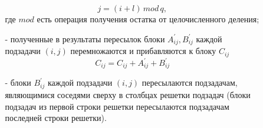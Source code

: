 \documentclass{report}
\begin{document}
\begin{enumerate}
\begin{itemize}
\begin{itemize}
$$                {\mathit j = (i + l) \, mod \, q,}
                $$
                где {\itshape $mod$} есть операция получения остатка от целочисленного деления;
                \item[-] полученные в результаты пересылок блоки {\itshape $A_{ij}^{'}, B_{ij}^{'}$} каждой подзадачи {\itshape $(i,j)$} перемножаются и прибавляются к блоку {\itshape $C_{ij}$}
                $$
                {\mathit C_{ij} = C_{ij} + A_{ij}^{'} + B_{ij}^{'}}
                $$
                \item[-] блоки {\itshape $B_{ij}^{'}$} каждой подзадачи {\itshape $(i,j)$} пересылаются подзадачам, являющимися соседями сверху в столбцах решетки подзадач (блоки подзадач из первой строки решетки пересылаются подзадачам последней строки решетки).
            \end{itemize}
        \end{itemize}
\end{enumerate}

\newpage

\end{document}
